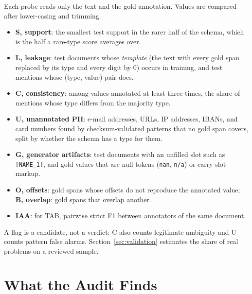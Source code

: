\documentclass[11pt]{article}
\begin{document}
Each probe reads only the text and the gold annotation. Values are
compared after lower-casing and trimming.
\begin{itemize}
\item \textbf{S, support}: the smallest test support in the rarer half
of the schema, which is the half a rare-type score averages over.
\item \textbf{L, leakage}: test documents whose \emph{template} (the
text with every gold span replaced by its type and every digit by 0)
occurs in training, and test mentions whose (type, value) pair does.
\item \textbf{C, consistency}: among values annotated at least three
times, the share of mentions whose type differs from the majority type.
\item \textbf{U, unannotated PII}: e-mail addresses, URLs, IP addresses,
IBANs, and card numbers found by checksum-validated patterns that no
gold span covers, split by whether the schema has a type for them.
\item \textbf{G, generator artifacts}: test documents with an unfilled
slot such as \texttt{[NAME\_1]}, and gold values that are null tokens
(\texttt{nan}, \texttt{n/a}) or carry slot markup.
\item \textbf{O, offsets}: gold spans whose offsets do not reproduce the
annotated value; \textbf{B, overlap}: gold spans that overlap another.
\item \textbf{IAA}: for TAB, pairwise strict F1 between annotators of
the same document.
\end{itemize}
A flag is a candidate, not a verdict: C also counts legitimate
ambiguity and U counts pattern false alarms.
Section~\ref{sec:validation} estimates the share of real problems on a
reviewed sample.

\section{What the Audit Finds}
\label{sec:audit}
\end{document}
